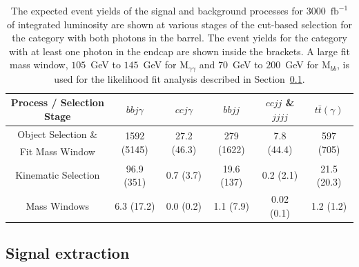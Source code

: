 \begin{table}[!ht]
\begin{center}
\vspace{2mm}

\begin{tabular}{|c|c|c|c|c|c|}
\hline
Process / Selection Stage           &  $bb j\gamma$                  &  $ccj\gamma$                  & $bb jj$                    &  $ccjj$ \& $jjjj$                       & $t\bar{t}(\gamma)$                \\  \hline
Object Selection \&                 &  \multirow{2}{*}{1592 (5145)}   &  \multirow{2}{*}{27.2 (46.3)}   & \multirow{2}{*}{279 (1622)} &  \multirow{2}{*}{7.8 (44.4)}  &  \multirow{2}{*}{597 (705)} \\ 
Fit Mass Window                     &                                &                               &                            &                               &                           \\ 
Kinematic Selection                 &  96.9  (351)                     &  0.7  (3.7)                   & 19.6 (137)                   &  0.2 (2.1)                    &  21.5 (20.3)                \\ 
Mass Windows                        &  6.3 (17.2)                     &  0.0  (0.2)                   & 1.1 (7.9)                 &  0.02 (0.1)                   &  1.2 (1.2)                \\  \hline
\end{tabular}

\caption{ The expected event yields of the signal and background processes
for $3000$~$\mathrm{fb}^{-1}$ of integrated luminosity
are shown at various stages of the cut-based selection for 
the category with both photons in the barrel. The event yields for the category with at least one photon in the endcap are shown inside the brackets. A large fit mass
window, $105$~GeV to $145$~GeV for $\mathrm{M}_{\gamma\gamma}$ and $70$~GeV to $200$~GeV for $\mathrm{M}_{bb}$,
is used for the likelihood fit analysis described in Section~\ref{sec:signalextraction}. }
\label{tab:EventYields}
\end{center}
\end{table}


\subsection{Signal extraction}
\label{sec:signalextraction}

